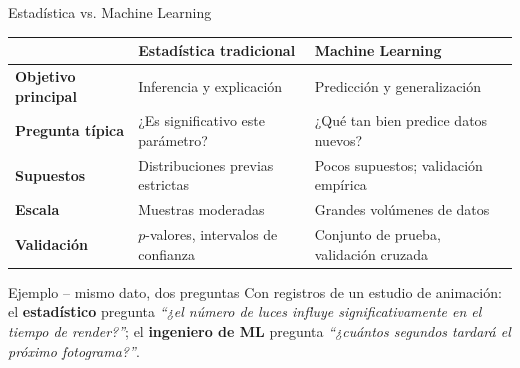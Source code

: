 \documentclass[10pt,aspectratio=169]{beamer}
\begin{document}
\begin{frame}{Estadística vs. Machine Learning}
  \centering
  \renewcommand{\arraystretch}{1.3}
  \begin{tabular}{>{\bfseries}p{3.2cm} p{5.1cm} p{5.1cm}}
    \toprule
    & Estadística tradicional & Machine Learning \\
    \midrule
    Objetivo principal & Inferencia y explicación & Predicción y generalización \\
    Pregunta típica & ¿Es significativo este parámetro? & ¿Qué tan bien predice datos nuevos? \\
    Supuestos & Distribuciones previas estrictas & Pocos supuestos; validación empírica \\
    Escala & Muestras moderadas & Grandes volúmenes de datos \\
    Validación & $p$-valores, intervalos de confianza & Conjunto de prueba, validación cruzada \\
    \bottomrule
  \end{tabular}
  \vfill
  \begin{exampleblock}{Ejemplo -- mismo dato, dos preguntas}
    Con registros de un estudio de animación: el \textbf{estadístico} pregunta
    \emph{``¿el número de luces influye significativamente en el tiempo de render?''};
    el \textbf{ingeniero de ML} pregunta \emph{``¿cuántos segundos tardará el próximo fotograma?''}.
  \end{exampleblock}
\end{frame}
\end{document}

